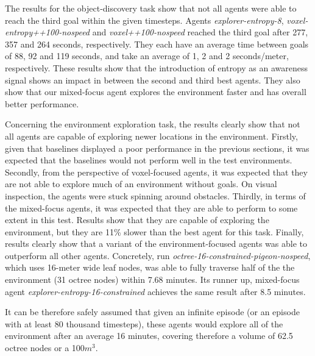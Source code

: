         The results for the object-discovery task show that not all agents were able to reach the third goal within the given timesteps. Agents \textit{explorer-entropy-8}, \textit{voxel-entropy++100-nospeed} and \textit{voxel++100-nospeed} reached the third goal after 277, 357 and 264 seconds, respectively. They each have an average time between goals of 88, 92 and 119 seconds, and take an average of 1, 2 and 2 seconds/meter, respectively.
        These results show that the introduction of entropy as an awareness signal shows an impact in between the second and third best agents. They also show that our mixed-focus agent explores the environment faster and has overall better performance. 
        
        
        Concerning the environment exploration task, the results clearly show that not all agents are capable of exploring newer locations in the environment. 
        Firstly, given that baselines displayed a poor performance in the previous sections, it was expected that the baselines would not perform well in the test environments.
        Secondly, from the perspective of voxel-focused agents, it was expected that they are not able to explore much of an environment without goals. On visual inspection, the agents were stuck spinning around obstacles. 
        Thirdly, in terms of the mixed-focus agents, it was expected that they are able to perform to some extent in this test. Results show that they are capable of exploring the environment, but they are 11\% slower than the best agent for this task.
        Finally, results clearly show that a variant of the environment-focused agents was able to outperform all other agents. Concretely, run \textit{octree-16-constrained-pigeon-nospeed}, which uses 16-meter wide leaf nodes, was able to fully traverse half of the the environment (31 octree nodes) within 7.68 minutes. Its runner up, mixed-focus agent \textit{explorer-entropy-16-constrained} achieves the same result after 8.5 minutes.
    
        It can be therefore safely assumed that given an infinite episode (or an episode with at least 80 thousand timesteps), these agents would explore all of the environment after an average 16 minutes, covering therefore a volume of 62.5 octree nodes or a 100$m^3$.
        
